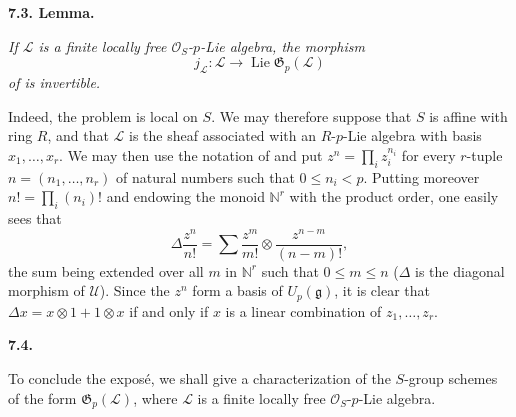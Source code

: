 \medskip
\noindent\textbf{7.3. Lemma.}
\label{sga3:VIIA:7.3}

\textit{If \(\mathcal L\) is a finite locally free
\(\mathcal O_S\)-\(p\)-Lie algebra, the morphism}
\[
  j_{\mathcal L}:
  \mathcal L
  \longrightarrow
  \operatorname{Lie}\mathfrak G_p(\mathcal L)
\]
\textit{of  is invertible.}

Indeed, the problem is local on \(S\). We may therefore suppose that
\(S\) is affine with ring \(R\), and that \(\mathcal L\) is the sheaf
associated with an \(R\)-\(p\)-Lie algebra with basis
\(x_1,\ldots,x_r\). We may then use the notation of  and put
\(z^n=\prod_iz_i^{n_i}\) for every \(r\)-tuple \(n=(n_1,\ldots,n_r)\) of
natural numbers such that \(0\leq n_i<p\). Putting moreover
\(n!=\prod_i(n_i)!\) and endowing the monoid \(\mathbb N^r\) with the
product order, one easily sees that
\[
  \Delta\frac{z^n}{n!}
  =
  \sum\frac{z^m}{m!}\otimes\frac{z^{n-m}}{(n-m)!},
\]
the sum being extended over all \(m\) in \(\mathbb N^r\) such that
\(0\leq m\leq n\) (\(\Delta\) is the diagonal morphism of
\(\mathcal U\)). Since the \(z^n\) form a basis of \(U_p(\mathfrak g)\), it
is clear that \(\Delta x=x\otimes1+1\otimes x\) if and only if \(x\) is a
linear combination of \(z_1,\ldots,z_r\).

\medskip
\noindent\textbf{7.4.}
\label{sga3:VIIA:7.4}

To conclude the expos\'e, we shall give a characterization of the
\(S\)-group schemes of the form \(\mathfrak G_p(\mathcal L)\), where
\(\mathcal L\) is a finite locally free \(\mathcal O_S\)-\(p\)-Lie algebra.

